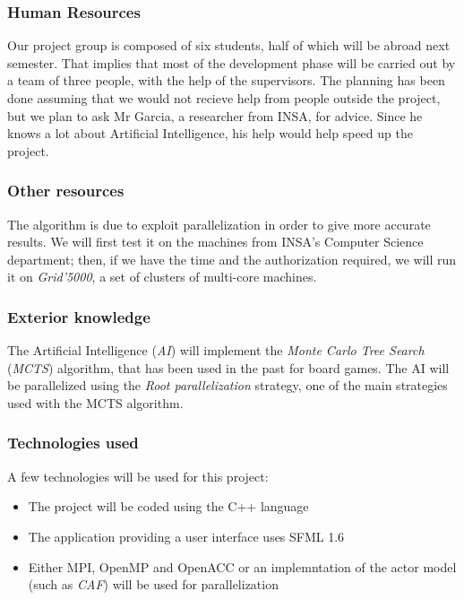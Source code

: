 \subsubsection{Human Resources}

Our project group is composed of six students, half of which will be abroad next semester.
That implies that most of the development phase will be carried out by a team of three people, with the help of the supervisors.
The planning has been done assuming that we would not recieve help from people outside the project, but we plan to ask Mr Garcia, a researcher from INSA, for advice.
Since he knows a lot about Artificial Intelligence, his help would help speed up the project.

\subsubsection{Other resources}

The algorithm is due to exploit parallelization in order to give more accurate results. We will first test it on the machines from INSA's Computer Science department;
then, if we have the time and the authorization required, we will run it on \emph{Grid'5000}, a set of clusters of multi-core machines.

\subsubsection{Exterior knowledge}

The Artificial Intelligence (\emph{AI}) will implement the \emph{Monte Carlo Tree Search} (\emph{MCTS}) algorithm, that has been used in the past for board games.
The AI will be parallelized using the \emph{Root parallelization} strategy, one of the main strategies used with the MCTS algorithm.

\subsubsection{Technologies used}

A few technologies will be used for this project:
\begin{itemize}
	\item The project will be coded using the C++ language
	\item The application providing a user interface uses SFML 1.6
	\item Either MPI, OpenMP and OpenACC or an implemntation of the actor model (such as \emph{CAF}) will be used for parallelization
\end{itemize}

